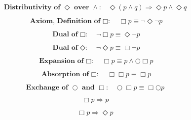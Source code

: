 \documentclass[fleqn, leqno]{article}
\newcommand{\next}{\bigcirc}
\newcommand{\event}{\Diamond}
\newcommand{\always}{\Box}
\newcommand{\spacer}{\vspace{-30pt}}
\begin{document}
\spacer

\begin{equation}\label{E:distEventAnd}
\textbf{Distributivity of $\event$ over $\land$:}\quad \event(p \land q) \Rightarrow \event p \land \event q
\end{equation}

\pagebreak

\begin{equation}\label{E:defAlways}
\textbf{Axiom, Definition of $\always$:}\quad \always p \equiv \lnot\event\lnot p
\end{equation}

\spacer

\begin{equation}\label{E:dualAlways}
\textbf{Dual of $\always$:}\quad \lnot\always p \equiv \event\lnot p
\end{equation}

\spacer

\begin{equation}\label{E:dualEvent}
\textbf{Dual of $\event$:}\quad \lnot\event p \equiv \always\lnot p
\end{equation}

\spacer

\begin{equation}\label{E:expansionAlways}
\textbf{Expansion of $\always$:}\quad \always p \equiv p \land \next\always p
\end{equation}

\spacer

\begin{equation}\label{E:IdemAlways}
\textbf{Absorption of $\always$:}\quad \always\always p \equiv \always p
\end{equation}

\spacer

\begin{equation}\label{E:dNextAlways}
\textbf{Exchange of $\next$ and $\always$:}\quad \next\always p \equiv \always\next p
\end{equation}

\spacer

\begin{equation}\label{E:impAlways}
\always p \Rightarrow p
\end{equation}

\spacer

\begin{equation}\label{E:impAlwaysE}
\always p \Rightarrow \event p
\end{equation}
\end{document}
